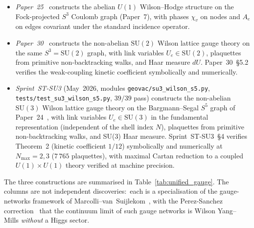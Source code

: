 \documentclass[11pt]{article}
\begin{document}
\begin{itemize}\setlength{\itemsep}{2pt}
\item \emph{Paper~25}~\cite{paper25} constructs the abelian
$U(1)$ Wilson--Hodge structure on the Fock-projected $S^3$ Coulomb
graph (Paper~7), with phases $\chi_v$ on nodes and $A_e$ on edges
covariant under the standard incidence operator.
\item \emph{Paper~30}~\cite{paper30} constructs the non-abelian
$\mathrm{SU}(2)$ Wilson lattice gauge theory on the same
$S^3 = \mathrm{SU}(2)$ graph, with link variables $U_e \in
\mathrm{SU}(2)$, plaquettes from primitive non-backtracking walks,
and Haar measure $dU$.  Paper~30~\S 5.2 verifies the weak-coupling
kinetic coefficient symbolically and numerically.
\item \emph{Sprint~ST-SU3} (May~2026, modules
\texttt{geovac/su3\_wilson\_s5.py},
\texttt{tests/test\_su3\_wilson\_s5.py}, $39/39$ pass) constructs
the non-abelian $\mathrm{SU}(3)$ Wilson lattice gauge theory on the
Bargmann--Segal $S^5$ graph of Paper~24~\cite{paper24}, with link
variables $U_e \in \mathrm{SU}(3)$ in the fundamental representation
(independent of the shell index $N$), plaquettes from primitive
non-backtracking walks, and SU(3) Haar measure.  Sprint~ST-SU3~\S 4
verifies Theorem~2 (kinetic coefficient $1/12$) symbolically and
numerically at $N_{\max} = 2, 3$ ($7\,765$ plaquettes), with maximal
Cartan reduction to a coupled $U(1) \times U(1)$ theory verified at
machine precision.
\end{itemize}

The three constructions are summarised in
Table~\ref{tab:unified_gauge}.  The columns are not independent
discoveries:\ each is a specialisation of the gauge-networks
framework of Marcolli--van~Suijlekom~\cite{marcolli_vs2014}, with
the Perez-Sanchez correction~\cite{perez_sanchez2024,%
perez_sanchez2025} that the continuum limit of such gauge networks
is Wilson Yang--Mills \emph{without} a Higgs sector.
\end{document}

